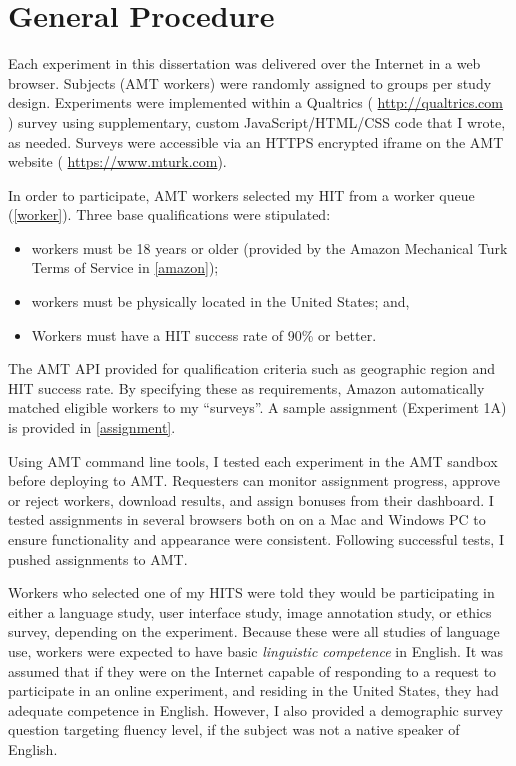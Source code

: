 \section{General Procedure}
\label{generalprocedure}

Each experiment in this dissertation was delivered over the Internet in a web browser. Subjects (AMT workers) were randomly assigned to groups per study design. Experiments were implemented within a Qualtrics ( \url{http://qualtrics.com} ) survey using supplementary, custom JavaScript\slash HTML\slash CSS code that I wrote, as needed. Surveys were accessible via an HTTPS encrypted iframe on the AMT website ( \url{https://www.mturk.com}). 

In order to participate, AMT workers selected my HIT from a worker queue  (\autoref{worker}).  Three base qualifications were stipulated:

\begin{sloppier}
\begin{itemize}
\item workers must be 18 years or older (provided by the Amazon Mechanical Turk Terms of Service in \autoref{amazon});
\item workers must be physically located in the United States; and,
\item Workers must have a HIT success rate of 90\% or better. 
\end{itemize}
\end{sloppier}

The AMT API provided for qualification criteria such as geographic region and HIT success rate. By specifying these as requirements, Amazon automatically matched eligible workers to my ``surveys''. A sample assignment (Experiment 1A) is provided in  \autoref{assignment}. 

Using AMT command line tools, I tested each experiment in the AMT sandbox before deploying to AMT. Requesters can monitor assignment progress, approve or reject workers, download results, and assign bonuses from their dashboard. I tested assignments in several browsers both on on a Mac and Windows PC to ensure functionality and appearance were consistent. Following successful tests, I pushed assignments to AMT. 

Workers who selected one of my HITS were told they would be participating in either a language study, user interface study, image annotation study, or ethics survey, depending on the experiment. Because these were all studies of language use, workers were expected to have basic \emph{linguistic competence} in English. It was assumed that if they were on the Internet capable of responding to a request to participate in an online experiment, and residing in the United States, they had adequate competence in English. However, I also provided a demographic survey question targeting fluency level, if the subject was not a native speaker of English.

